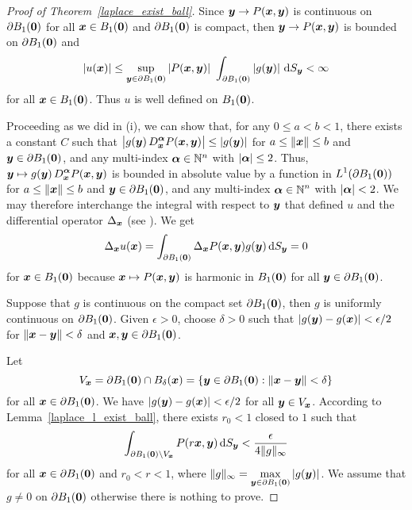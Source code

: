 \begin{proof}[Proof of Theorem~\ref{laplace_exist_ball}]
 Since ${\bm{y}} \rightarrow P({\bm{x}},{\bm{y}})$ is continuous
on $\partial B_1({\bm{0}})$ for all ${\bm{x}} \in B_1({\bm{0}})$ and
$\partial B_1({\bm{0}})$ is compact, then
${\bm{y}} \rightarrow P({\bm{x}},{\bm{y}})$ is bounded on
$\partial B_1({\bm{0}})$ and
\[
\left| u(\VEC{x}) \right| \leq \sup_{\VEC{y} \in \partial B_1(\VEC{0})}
\left| P(\VEC{x},\VEC{y}) \right| \ 
\int_{\partial B_1(\VEC{0})} \left| g(\VEC{y}) \right| \dss{S}{y}
< \infty
\]
for all ${\bm{x}} \in B_1({\bm{0}})$.
Thus $u$ is well defined on $B_1({\bm{0}})$.

 Proceeding as we did in (i), we can show that, for any
$0\leq a < b <1$, there exists a constant $C$ such that 
$\displaystyle \big|g({\bm{y}})\,
D^{{\bm{\alpha}}}_{{\bm{x}}} P({\bm{x}},{\bm{y}})\big|
\leq |g({\bm{y}})|$ for $a \leq \|{\bm{x}} \| \leq b$ and
${\bm{y}} \in \partial B_1({\bm{0}})$, and any multi-index
${\bm{\alpha}} \in \mathbb{N}^n$ with $|{\bm{\alpha}}|\leq 2$.  Thus,
$\displaystyle {\bm{y}} \mapsto g({\bm{y}})\, D^{{\bm{\alpha}}}_{{\bm{x}}}
P({\bm{x}},{\bm{y}})$
is bounded in absolute value by a function in
$\displaystyle L^1(\partial B_1({\bm{0}}))$ for
$a \leq \|{\bm{x}} \| \leq b$ and
${\bm{y}} \in \partial B_1({\bm{0}})$, and any multi-index
$\displaystyle {\bm{\alpha}} \in \mathbb{N}^n$ with $|{\bm{\alpha}}|<2$.  
We may therefore interchange the integral with respect to ${\bm{y}}$
that defined $u$ and the differential operator $\Delta_{{\bm{x}}}$
(see \cite{Flem}).  We get
\[
\Delta_{{\bm{x}}} u({\bm{x}}) = \int_{\partial B_1({\bm{0}})}
\Delta_{{\bm{x}}}P({\bm{x}},{\bm{y}}) g({\bm{y}}) \,\mathrm{d}{S}_{{\bm{y}}} = 0
\]
for ${\bm{x}} \in B_1({\bm{0}})$
because ${\bm{x}} \mapsto P({\bm{x}},{\bm{y}})$ is harmonic in
$B_1({\bm{0}})$ for all ${\bm{y}} \in \partial B_1({\bm{0}})$.

 Suppose that $g$ is continuous on the compact set
$\partial B_1({\bm{0}})$, then $g$ is uniformly continuous on
$\partial B_1({\bm{0}})$.  Given $\epsilon>0$, choose $\delta>0$ such
that
$\displaystyle |g({\bm{y}}) - g({\bm{x}})| < \epsilon/2$ for
$\|{\bm{x}}-{\bm{y}}\| < \delta$ and
${\bm{x}},{\bm{y}} \in \partial B_1({\bm{0}})$.

Let
\[
V_{{\bm{x}}} = \partial B_1({\bm{0}}) \cap B_\delta({\bm{x}})
= \left\{ {\bm{y}} \in \partial B_1({\bm{0}})
: \|{\bm{x}} - {\bm{y}} \| < \delta \right\}
\]
for all ${\bm{x}} \in \partial B_1({\bm{0}})$.  We have
$\displaystyle |g({\bm{y}}) - g({\bm{x}})| < \epsilon/2$ for all
${\bm{y}} \in V_{{\bm{x}}}$.
According to Lemma~\ref{laplace_l_exist_ball}, there exists $r_0<1$
closed to $1$ such that
\[
\int_{\partial B_1({\bm{0}})\setminus V_{{\bm{x}}}}
P(r{\bm{x}},{\bm{y}}) \,\mathrm{d}{S}_{{\bm{y}}} < \frac{\epsilon}{4\|g\|_\infty}
\]
for all ${\bm{x}} \in \partial B_1({\bm{0}})$ and $r_0 < r < 1$, where
$\displaystyle \|g\|_{\infty} = \max_{{\bm{y}}\in\partial B_1({\bm{0}})}
|g({\bm{y}})|$.
We assume that $g \neq 0$ on $\partial B_1({\bm{0}})$ otherwise there
is nothing to prove.


\end{proof}
